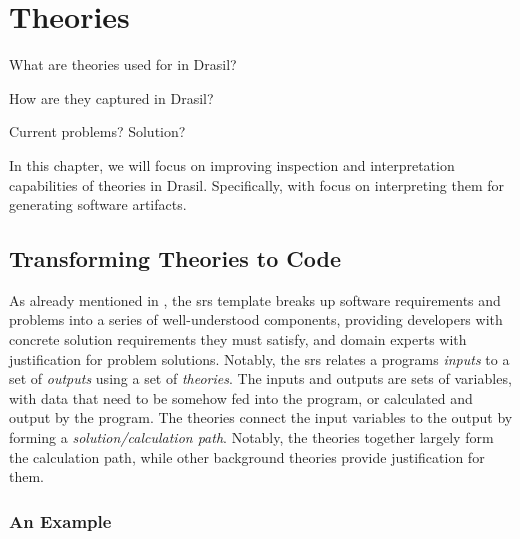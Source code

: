 \chapter{Theories}
\label{chap:modelkinds}

\begin{writingdirectives}
    \item What are theories used for in Drasil?
    \item How are they captured in Drasil?
    \item Current problems? Solution?
\end{writingdirectives}

In this chapter, we will focus on improving inspection and interpretation
capabilities of theories in Drasil. Specifically, with focus on interpreting
them for generating software artifacts.

\section{Transforming Theories to Code}
\label{chap:modelkinds:sec:transforming-theories-to-code}

As already mentioned in , the \acs{srs} template
\cite{SmithAndLai2005} breaks up software requirements and problems into a
series of well-understood components, providing developers with concrete
solution requirements they must satisfy, and domain experts with justification
for problem solutions. Notably, the \acs{srs} relates a programs \textit{inputs}
to a set of \textit{outputs} using a set of \textit{theories}. The inputs and
outputs are sets of variables, with data that need to be somehow fed into the
program, or calculated and output by the program. The theories connect the input
variables to the output by forming a \textit{solution/calculation path}.
Notably, the  \cite{SmithAndLai2005} theories together largely form the
calculation path, while other background theories provide justification for
them.

\subsection{An Example}
\label{chap:modelkinds:sec:transforming-theories-to-code:subsec:an-example}

